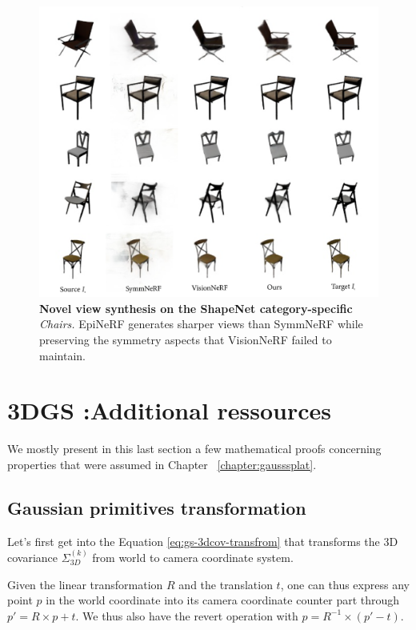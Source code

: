 \begin{figure}[htp!]
    \begin{center}
  \includegraphics[width=\linewidth]{images/epinerf/supp_Chairs_additional_inference.png}
  \caption{\textbf{Novel view synthesis on the ShapeNet category-specific} \textit{Chairs. }EpiNeRF generates sharper views than SymmNeRF while preserving the symmetry aspects that VisionNeRF failed to maintain.}
  \label{fig:supp_chairs}
  \end{center}
\end{figure}

\chapter{3DGS :Additional ressources}

We mostly present in this last section a few mathematical proofs concerning properties that were assumed in Chapter ~\ref{chapter:gausssplat}. 

\section{Gaussian primitives transformation}
\label{appendix:cov}
Let's first get into the Equation \ref{eq:gs-3dcov-transfrom} that transforms the 3D covariance $\Sigma^{(k)}_{3D}$ from world to camera coordinate system.

Given the linear transformation $R$ and the translation $t$, one can thus express any point $p$ in the world coordinate into its camera coordinate counter part through $p' = R\times p + t$. We thus also have the revert operation with $p = R^{-1}\times (p' - t)$. 

